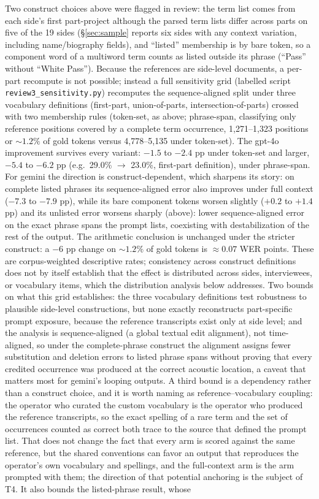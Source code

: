 \documentclass[11pt]{article}
\begin{document}
Two construct choices above were flagged in review: the term list comes from each side's first part-project although the parsed term lists differ across parts on five of the 19 sides (\S\ref{sec:sample} reports six sides with any context variation, including name/biography fields), and ``listed'' membership is by bare token, so a component word of a multiword term counts as listed outside its phrase (``Pass'' without ``White Pass''). Because the references are side-level documents, a per-part recompute is not possible; instead a full sensitivity grid (labelled script \texttt{review3\_sensitivity.py}) recomputes the sequence-aligned split under three vocabulary definitions (first-part, union-of-parts, intersection-of-parts) crossed with two membership rules (token-set, as above; phrase-span, classifying only reference positions covered by a complete term occurrence, 1{,}271--1{,}323 positions or ${\sim}1.2\%$ of gold tokens versus 4{,}778--5{,}135 under token-set). The gpt-4o improvement survives every variant: $-1.5$ to $-2.4$ pp under token-set and larger, $-5.4$ to $-6.2$ pp (e.g.\ 29.0\% $\rightarrow$ 23.0\%, first-part definition), under phrase-span. For gemini the direction is construct-dependent, which sharpens its story: on complete listed phrases its sequence-aligned error also improves under full context ($-7.3$ to $-7.9$ pp), while its bare component tokens worsen slightly ($+0.2$ to $+1.4$ pp) and its unlisted error worsens sharply (above): lower sequence-aligned error on the exact phrase spans the prompt lists, coexisting with destabilization of the rest of the output. The arithmetic conclusion is unchanged under the stricter construct: a $-6$ pp change on ${\sim}1.2\%$ of gold tokens is ${\approx}0.07$ WER points. These are corpus-weighted descriptive rates; consistency across construct definitions does not by itself establish that the effect is distributed across sides, interviewees, or vocabulary items, which the distribution analysis below addresses. Two bounds on what this grid establishes: the three vocabulary definitions test robustness to plausible side-level constructions, but none exactly reconstructs part-specific prompt exposure, because the reference transcripts exist only at side level; and the analysis is sequence-aligned (a global textual edit alignment), not time-aligned, so under the complete-phrase construct the alignment assigns fewer substitution and deletion errors to listed phrase spans without proving that every credited occurrence was produced at the correct acoustic location, a caveat that matters most for gemini's looping outputs. A third bound is a dependency rather than a construct choice, and it is worth naming as reference--vocabulary coupling: the operator who curated the custom vocabulary is the operator who produced the reference transcripts, so the exact spelling of a rare term and the set of occurrences counted as correct both trace to the source that defined the prompt list. That does not change the fact that every arm is scored against the same reference, but the shared conventions can favor an output that reproduces the operator's own vocabulary and spellings, and the full-context arm is the arm prompted with them; the direction of that potential anchoring is the subject of T4. It also bounds the listed-phrase result, whose 
\end{document}
